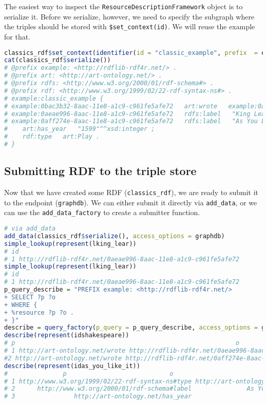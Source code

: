 

The easiest way to inspect the {\tt ResourceDescriptionFramework} object is to serialize it. Before we serialize, however, we need to specify the subgraph where the triples should be stored with {\tt \$set\_context(id)}. We will reuse the example for that.

\begin{lstlisting}[language=R,
basicstyle=\ttfamily\tiny]
classics_rdf$set_context(identifier(id = "classic_example", prefix  = eg))
cat(classics_rdf$serialize())
# @prefix example: <http://rdflib-rdf4r.net/> .
# @prefix art: <http://art-ontology.net/> .
# @prefix rdfs: <http://www.w3.org/2000/01/rdf-schema#> .
# @prefix rdf: <http://www.w3.org/1999/02/22-rdf-syntax-ns#> .
# example:classic_example {
# example:0bac3b32-8aac-11e8-a1c9-c961fe5afe72   art:wrote   example:0aeae996-8aac-11e8-a1c9-c961fe5afe72 ,  example:0aff274e-8aac-11e8-a1c9-c961fe5afe72 . 
# example:0aeae996-8aac-11e8-a1c9-c961fe5afe72   rdfs:label   "King Lear"@en . 
# example:0aff274e-8aac-11e8-a1c9-c961fe5afe72   rdfs:label   "As You Like It"@en ;
#	 art:has_year   "1599"^^xsd:integer ;
#	 rdf:type   art:Play .
# }
\end{lstlisting}

\subsection{Submitting RDF to the triple store}

Now that we have created some RDF ({\tt classics\_rdf}), we are ready to submit it to the endpoint ({\tt graphdb}). We can either submit it directly via {\tt add\_data}, or we can use the {\tt add\_data\_factory} to create a submitter function.

\begin{lstlisting}[language=R,
basicstyle=\ttfamily\tiny]
# via add_data
add_data(classics_rdf$serialize(), access_options = graphdb)
simple_lookup(represent(lking_lear))
# id
# 1 http://rdflib-rdf4r.net/0aeae996-8aac-11e8-a1c9-c961fe5afe72
simple_lookup(represent(lking_lear))
# id
# 1 http://rdflib-rdf4r.net/0aeae996-8aac-11e8-a1c9-c961fe5afe72
p_query_describe = "PREFIX example: <http://rdflib-rdf4r.net/>
+ SELECT ?p ?o
+ WHERE {
+ %resource ?p ?o .
+ }"
describe = query_factory(p_query = p_query_describe, access_options = graphdb)
describe(represent(idshakespeare))
# p                                                            o
# 1 http://art-ontology.net/wrote http://rdflib-rdf4r.net/0aeae996-8aac-11e8-a1c9-c961fe5afe72
#2 http://art-ontology.net/wrote http://rdflib-rdf4r.net/0aff274e-8aac-11e8-a1c9-c961fe5afe72
describe(represent(idas_you_like_it))
#               p                            o
# 1 http://www.w3.org/1999/02/22-rdf-syntax-ns#type http://art-ontology.net/Play
# 2      http://www.w3.org/2000/01/rdf-schema#label               As You Like It
# 3                http://art-ontology.net/has_year                         1599
\end{lstlisting}

